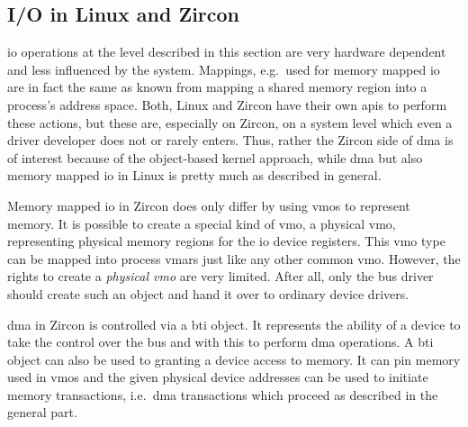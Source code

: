 \subsection{I/O in Linux and Zircon}
\ac{io} operations at the level described in this section are very hardware dependent and less influenced by the system. 
Mappings, e.g.\ used for memory mapped \ac{io} are in fact the same as known from mapping a shared memory region into a process's address space.
Both, Linux and Zircon have their own \acp{api} to perform these actions, but these are, especially on Zircon, on a system level which even a driver developer does not or rarely enters.  
Thus, rather the Zircon side of \ac{dma} is of interest because of the object-based kernel approach, while \ac{dma} but also memory mapped \ac{io} in Linux is pretty much as described in general.

Memory mapped \ac{io} in Zircon does only differ by using \acp{vmo} to represent memory.
It is possible to create a special kind of \ac{vmo}, a physical \ac{vmo}, representing physical memory regions for the \ac{io} device registers.
This \ac{vmo} type can be mapped into process \acp{vmar} just like any other common \ac{vmo}.
However, the rights to create a \textit{physical \ac{vmo}} are very limited.
After all, only the bus driver should create such an object and hand it over to ordinary device drivers\cite{zircon-irc-io}.

\ac{dma} in Zircon is controlled via a \ac{bti} object.
It represents the ability of a device to take the control over the bus and with this to perform \ac{dma} operations.
A \ac{bti} object can also be used to granting a device access to memory.
It can pin memory used in \acp{vmo} and the given physical device addresses can be used to initiate memory transactions, i.e.\ \ac{dma} transactions which proceed as described in the general part\cite{zircon-bti}.


